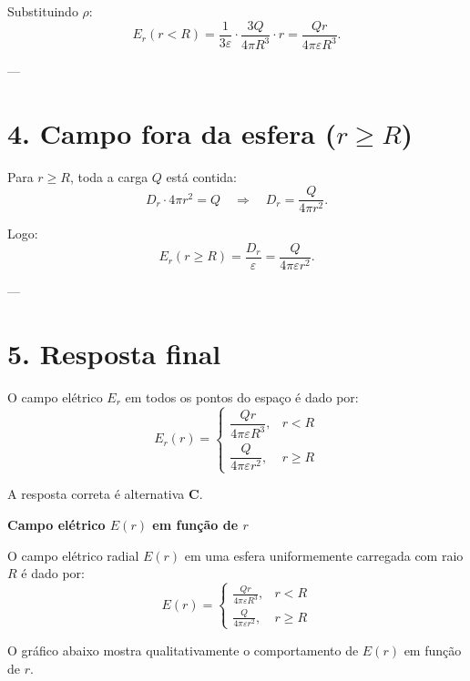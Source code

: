 \documentclass[a4paper,12pt]{article}
\begin{document}
\begin{flushleft}
Substituindo \(\rho\):
\[
E_r(r<R) =
\frac{1}{3\varepsilon} \cdot \frac{3Q}{4\pi R^3} \cdot r =
\frac{Q r}{4\pi \varepsilon R^3}.
\]

---

\section*{4. Campo fora da esfera (\( r \geq R \))}

Para \( r \geq R \), toda a carga \( Q \) está contida:
\[
D_r \cdot 4\pi r^2 = Q \quad \Rightarrow \quad D_r = \frac{Q}{4\pi r^2}.
\]

Logo:
\[
E_r(r \geq R) =
\frac{D_r}{\varepsilon} =
\frac{Q}{4\pi \varepsilon r^2}.
\]

---

\section*{5. Resposta final}

O campo elétrico \( E_r \) em todos os pontos do espaço é dado por:
\[
\boxed{
E_r(r) =
\begin{cases}
\dfrac{Q r}{4\pi \varepsilon R^3}, & r < R \\[12pt]
\dfrac{Q}{4\pi \varepsilon r^2}, & r \geq R
\end{cases}
}
\]

A resposta correta é alternativa \colorbox{green!50}{\textbf{C}}.
\end{flushleft}

\begin{center}
\textbf{Campo elétrico \(E(r)\) em função de \(r\)}
\end{center}

O campo elétrico radial \(E(r)\) em uma esfera uniformemente carregada com raio \(R\) é dado por:
\[
E(r) =
\begin{cases}
\displaystyle \frac{Q r}{4\pi \varepsilon R^3}, & r < R \\[12pt]
\displaystyle \frac{Q}{4\pi \varepsilon r^2}, & r \geq R
\end{cases}
\]

O gráfico abaixo mostra qualitativamente o comportamento de \(E(r)\) em função de \(r\).

\bigskip
\end{document}
